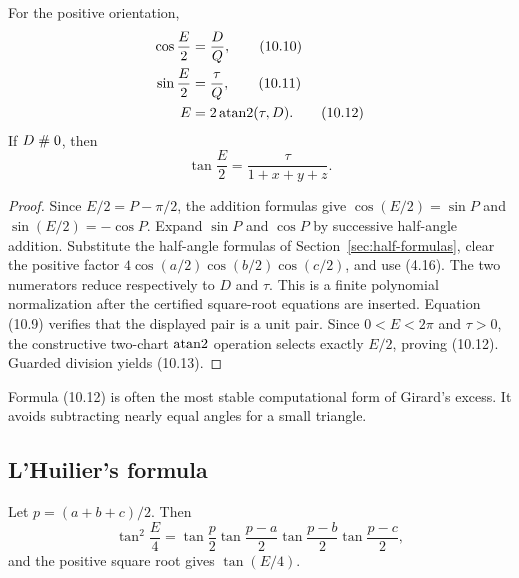 \begin{theorem}
\label{thm:solid-angle}
For the positive orientation,
\begin{align}
 \cos\frac E2&=\frac{D}{Q},                                \tag{10.10}\\
 \sin\frac E2&=\frac{\tau}{Q},                             \tag{10.11}\\
 E&=2\operatorname{atan2}(\tau,D).                                     \tag{10.12}
\end{align}
If \(D\mathrel{\#}0\), then
\begin{equation}
 \tan\frac E2=\frac{\tau}{1+x+y+z}.                       \tag{10.13}
\end{equation}
\end{theorem}

\begin{proof}
Since \(E/2=P-\pi/2\), the addition formulas give
\(\cos(E/2)=\sin P\) and \(\sin(E/2)=-\cos P\).  Expand
\(\sin P\) and \(\cos P\) by successive half-angle addition.  Substitute the
half-angle formulas of Section~\ref{sec:half-formulas}, clear the positive
factor \(4\cos(a/2)\cos(b/2)\cos(c/2)\), and use (4.16).  The two numerators
reduce respectively to \(D\) and \(\tau\).  This is a finite polynomial
normalization after the certified square-root equations are inserted.
Equation (10.9) verifies that the displayed pair is a unit pair.  Since
\(0<E<2\pi\) and \(\tau>0\), the constructive two-chart \(\operatorname{atan2}\) operation
selects exactly \(E/2\), proving (10.12).  Guarded division yields (10.13).
\end{proof}

Formula (10.12) is often the most stable computational form of Girard's
excess.  It avoids subtracting nearly equal angles for a small triangle.

\subsection{L'Huilier's formula}

\begin{corollary}[L'Huilier]
\label{cor:lhuillier}
Let \(p=(a+b+c)/2\).  Then
\begin{equation}
 \tan^2\frac E4=
 \tan\frac p2
 \tan\frac{p-a}{2}
 \tan\frac{p-b}{2}
 \tan\frac{p-c}{2},                                       \tag{10.14}
\end{equation}
and the positive square root gives \(\tan(E/4)\).
\end{corollary}


